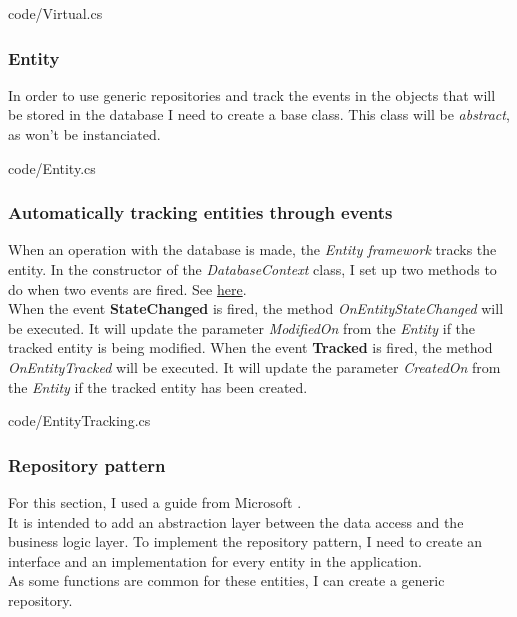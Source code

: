         
        {code/Virtual.cs}

        \subsubsection{Entity}
            In order to use generic repositories and track the events in the objects that will be stored in the database I need to create a base class. This class will be \textit{abstract}, as won't be instanciated. 
            
            
            {code/Entity.cs}

        \subsubsection{Automatically tracking entities through events}
            When an operation with the database is made, the \textit{Entity framework} tracks the entity.  
            In the constructor of the \textit{DatabaseContext} class, I set up two methods to do when two events are fired. See \href{https://docs.microsoft.com/en-us/dotnet/api/microsoft.entityframeworkcore.changetracking.changetracker?view=efcore-5.0}{here}. \\

            When the event \textbf{StateChanged} is fired, the method \textit{OnEntityStateChanged} will be executed. It will update the parameter \textit{ModifiedOn} from the \textit{Entity} if the tracked entity is being modified.
            When the event \textbf{Tracked} is fired, the method \textit{OnEntityTracked} will be executed. It will update the parameter \textit{CreatedOn} from the \textit{Entity} if the tracked entity has been created.

                
                {code/EntityTracking.cs}
        
        \subsubsection{Repository pattern}
            For this section, I used a guide from Microsoft \cite{RepoAndUW}. \\
            It is intended to add an abstraction layer between the data access and the business logic layer. To implement the repository pattern, I need to create an interface and an implementation for every entity in the application. \\
            As some functions are common for these entities, I can create a generic repository. \\

